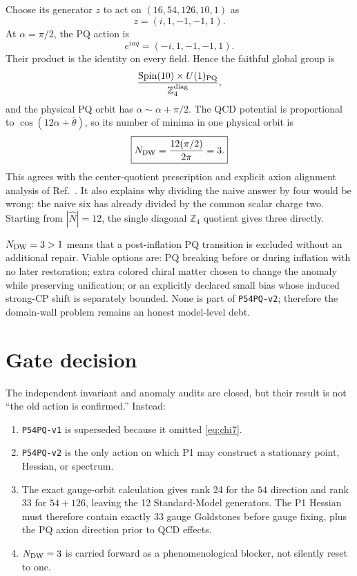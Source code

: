 \documentclass[11pt]{article}
\newcommand{\Spin}{\operatorname{Spin}}
\begin{document}
Choose its generator $z$ to act on
$(16,54,126,10,1)$ as
\begin{equation}
 z=(i,1,-1,-1,1).
\end{equation}
At $\alpha=\pi/2$, the PQ action is
\begin{equation}
 e^{i\alpha q}=(-i,1,-1,-1,1).
\end{equation}
Their product is the identity on every field.  Hence the faithful global
group is
\begin{equation}
 \frac{\Spin(10)\times U(1)_{\rm PQ}}{\mathbb Z_4^{\rm diag}},
 \label{eq:globalform}
\end{equation}
and the physical PQ orbit has $\alpha\sim\alpha+\pi/2$.  The QCD potential
is proportional to $\cos(12\alpha+\bar\theta)$, so its number of minima in
one physical orbit is
\begin{equation}
 \boxed{N_{\rm DW}=\frac{12(\pi/2)}{2\pi}=3.}
 \label{eq:ndw}
\end{equation}
This agrees with the center-quotient prescription and explicit axion
alignment analysis of Ref.~\cite{Ernst2018}.  It also explains why dividing
the naive answer by four would be wrong: the naive six has already divided
by the common scalar charge two.  Starting from $|\widehat N|=12$, the
single diagonal $\mathbb Z_4$ quotient gives three directly.

$N_{\rm DW}=3>1$ means that a post-inflation PQ transition is excluded
without an additional repair.  Viable options are: PQ breaking before or
during inflation with no later restoration; extra colored chiral matter
chosen to change the anomaly while preserving unification; or an explicitly
declared small bias whose induced strong-CP shift is separately bounded.
None is part of \texttt{P54PQ-v2}; therefore the domain-wall problem remains
an honest model-level debt.

\section{Gate decision}

The independent invariant and anomaly audits are closed, but their result is
not ``the old action is confirmed.''  Instead:
\begin{enumerate}
\item \texttt{P54PQ-v1} is superseded because it omitted \eqref{eq:chi7}.
\item \texttt{P54PQ-v2} is the only action on which P1 may construct a
stationary point, Hessian, or spectrum.
\item The exact gauge-orbit calculation gives rank 24 for the $54$ direction
and rank 33 for $54+126$, leaving the 12 Standard-Model generators.  The P1
Hessian must therefore contain exactly 33 gauge Goldstones before gauge
fixing, plus the PQ axion direction prior to QCD effects.
\item $N_{\rm DW}=3$ is carried forward as a phenomenological blocker, not
silently reset to one.
\end{enumerate}
\end{document}
